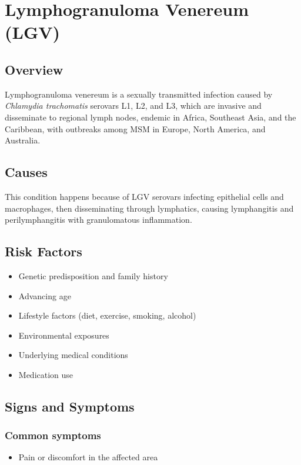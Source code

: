 \chapter{Lymphogranuloma Venereum (LGV)}
\label{sec:Lymphogranuloma Venereum}

\section{Overview}
Lymphogranuloma venereum is a sexually transmitted infection caused by \textit{Chlamydia trachomatis} serovars L1, L2, and L3, which are invasive and disseminate to regional lymph nodes, endemic in Africa, Southeast Asia, and the Caribbean, with outbreaks among MSM in Europe, North America, and Australia.
\section{Causes}
This condition happens because of LGV serovars infecting epithelial cells and macrophages, then disseminating through lymphatics, causing lymphangitis and perilymphangitis with granulomatous inflammation.     
\section{Risk Factors}

\begin{itemize}[noitemsep]
  \item Genetic predisposition and family history
  \item Advancing age
  \item Lifestyle factors (diet, exercise, smoking, alcohol)
  \item Environmental exposures
  \item Underlying medical conditions
  \item Medication use
\end{itemize}
\section{Signs and Symptoms}

\subsection{Common symptoms}
\begin{itemize}[noitemsep]
  \item Pain or discomfort in the affected area
  \end{itemize}

